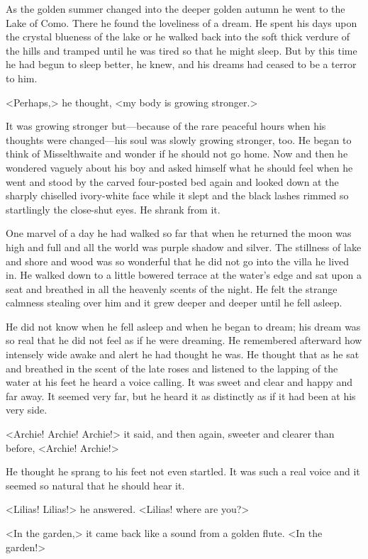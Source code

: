 As the golden summer changed into the deeper golden autumn he went to the Lake of Como. There he found the loveliness of a dream. He spent his days upon the crystal blueness of the lake or he walked back into the soft thick verdure of the hills and tramped until he was tired so that he might sleep. But by this time he had begun to sleep better, he knew, and his dreams had ceased to be a terror to him.

<Perhaps,> he thought, <my body is growing stronger.>

It was growing stronger but—because of the rare peaceful hours when his thoughts were changed—his soul was slowly growing stronger, too. He began to think of Misselthwaite and wonder if he should not go home. Now and then he wondered vaguely about his boy and asked himself what he should feel when he went and stood by the carved four-posted bed again and looked down at the sharply chiselled ivory-white face while it slept and the black lashes rimmed so startlingly the close-shut eyes. He shrank from it.

One marvel of a day he had walked so far that when he returned the moon was high and full and all the world was purple shadow and silver. The stillness of lake and shore and wood was so wonderful that he did not go into the villa he lived in. He walked down to a little bowered terrace at the water's edge and sat upon a seat and breathed in all the heavenly scents of the night. He felt the strange calmness stealing over him and it grew deeper and deeper until he fell asleep.

He did not know when he fell asleep and when he began to dream; his dream was so real that he did not feel as if he were dreaming. He remembered afterward how intensely wide awake and alert he had thought he was. He thought that as he sat and breathed in the scent of the late roses and listened to the lapping of the water at his feet he heard a voice calling. It was sweet and clear and happy and far away. It seemed very far, but he heard it as distinctly as if it had been at his very side.

<Archie! Archie! Archie!> it said, and then again, sweeter and clearer than before, <Archie! Archie!>

He thought he sprang to his feet not even startled. It was such a real voice and it seemed so natural that he should hear it.

<Lilias! Lilias!> he answered. <Lilias! where are you?>

<In the garden,> it came back like a sound from a golden flute. <In the garden!>

